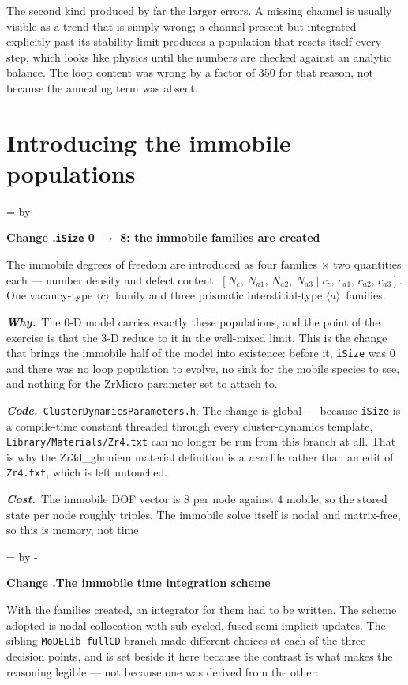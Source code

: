 \documentclass[11pt,a4paper]{article}
\newcommand{\code}[1]{\texttt{\small #1}}
\newcommand{\aloop}{\ensuremath{\langle a\rangle}}
\newcommand{\cloop}{\ensuremath{\langle c\rangle}}
\newcommand{\needlines}[1]{%
  \par\dimen0=\pagegoal \advance\dimen0 by -\pagetotal
  \ifdim\dimen0<#1\baselineskip \newpage \fi}
\newcounter{chg}
\newcommand{\change}[1]{%
  \needlines{4}%
  \refstepcounter{chg}%
  \par\medskip\noindent
  {\bfseries\boldmath Change \thechg.\quad #1}%
  \par\nobreak\smallskip}
\newcommand{\why}[1]{\par\noindent\textbf{\itshape Why.}\ #1\par}
\newcommand{\impact}[1]{\par\noindent\textbf{\itshape Code.}\ #1\par}
\newcommand{\cost}[1]{\par\noindent\textbf{\itshape Cost.}\ #1\par}
\begin{document}
The second kind produced by far the larger errors. A missing channel is
usually visible as a trend that is simply wrong; a channel present but
integrated explicitly past its stability limit produces a population that
resets itself every step, which looks like physics until the numbers are
checked against an analytic balance. The loop content was wrong by a factor of
350 for that reason, not because the annealing term was absent.

\section{Introducing the immobile populations}

\change{\code{iSize} 0 $\rightarrow$ 8: the immobile families are created}
\label{chg:baseline}
The immobile degrees of freedom are introduced as four families $\times$ two
quantities each --- number density and defect content:
$[N_c,\,N_{a1},\,N_{a2},\,N_{a3}\;|\;c_c,\,c_{a1},\,c_{a2},\,c_{a3}]$.
One vacancy-type \cloop\ family and three prismatic interstitial-type \aloop\
families.
\why{The 0-D model carries exactly these populations, and the point of the
exercise is that the 3-D reduce to it in the well-mixed limit. This is the
change that brings the immobile half of the model into existence: before it,
\code{iSize} was 0 and there was no loop population to evolve, no sink for the
mobile species to see, and nothing for the ZrMicro parameter set to attach
to.}
\impact{\code{ClusterDynamicsParameters.h}. The change is global --- because
\code{iSize} is a compile-time constant threaded through every
cluster-dynamics template, \code{Library/Materials/Zr4.txt} can no longer be
run from this branch at all. That is why the Zr3d\_ghoniem material definition
is a \emph{new} file rather than an edit of \code{Zr4.txt}, which is left
untouched.}
\cost{The immobile DOF vector is $8$ per node against $4$ mobile, so the
stored state per node roughly triples. The immobile solve itself is nodal and
matrix-free, so this is memory, not time.}

\change{The immobile time integration scheme}
\label{chg:rediscretize}
With the families created, an integrator for them had to be written. The
scheme adopted is nodal collocation with sub-cycled, fused semi-implicit
updates. The sibling \code{MoDELib-fullCD} branch made different choices at
each of the three decision points, and is set beside it here because the
contrast is what makes the reasoning legible --- not because one was derived
from the other:
\end{document}
